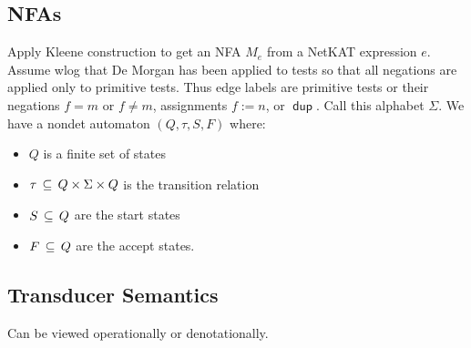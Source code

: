\documentclass{article}
\newcommand\pdup{\mathop{\mathsf{dup}}}
\begin{document}
\subsection*{NFAs}

Apply Kleene construction to get an NFA $M_e$ from a NetKAT expression $e$. Assume wlog that De Morgan has been applied to tests so that all negations are applied only to primitive tests. Thus edge labels are primitive tests or their negations $f = m$ or $f\neq m$, assignments $f := n$, or $\pdup$. Call this alphabet $\Sigma$. We have a nondet automaton $(Q,\tau,S,F)$ where:
\begin{itemize}
\item
$Q$ is a finite set of states
\item
$\tau\,\subseteq\, Q\times\Sigma\times Q$ is the transition relation
\item
$S\,\subseteq\, Q$ are the start states
\item
$F\,\subseteq\, Q$ are the accept states.
\end{itemize}

\subsection*{Transducer Semantics}

Can be viewed operationally or denotationally.
\end{document}

